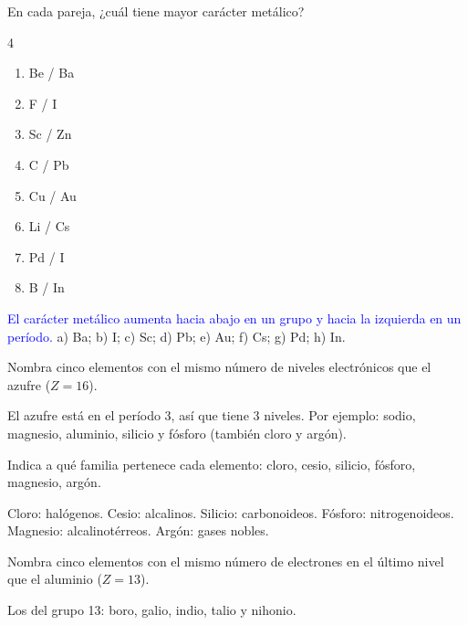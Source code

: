 \begin{exercise}
    En cada pareja, ¿cuál tiene mayor carácter metálico?
    \begin{multicols}{4}
        \begin{enumerate}[label=\alph*)]
            \item Be / Ba
            \item F / I
            \item Sc / Zn
            \item C / Pb
            \item Cu / Au
            \item Li / Cs
            \item Pd / I
            \item B / In
        \end{enumerate}
    \end{multicols}
    \begin{solu}
        \textcolor{blue}{El carácter metálico aumenta hacia abajo en un grupo y hacia la izquierda en un período.}
        a) Ba; b) I; c) Sc; d) Pb; e) Au; f) Cs; g) Pd; h) In.
    \end{solu}
\end{exercise}

\begin{exercise}
    Nombra cinco elementos con el mismo número de niveles electrónicos que el azufre (\(Z = 16\)).
    \begin{solu}
        El azufre está en el período 3, así que tiene 3 niveles. Por ejemplo: sodio, magnesio, aluminio, silicio y fósforo (también cloro y argón).
    \end{solu}
\end{exercise}

\begin{exercise}
    Indica a qué familia pertenece cada elemento: cloro, cesio, silicio, fósforo, magnesio, argón.
    \begin{solu}
        Cloro: halógenos. Cesio: alcalinos. Silicio: carbonoideos. Fósforo: nitrogenoideos. Magnesio: alcalinotérreos. Argón: gases nobles.
    \end{solu}
\end{exercise}

\begin{exercise}
    Nombra cinco elementos con el mismo número de electrones en el último nivel que el aluminio (\(Z = 13\)).
    \begin{solu}
        Los del grupo 13: boro, galio, indio, talio y nihonio.
    \end{solu}
\end{exercise}

